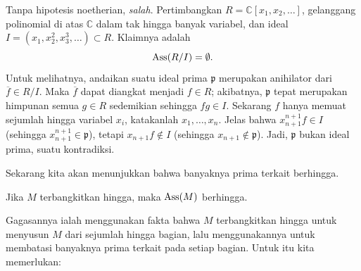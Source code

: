 \begin{example}
Tanpa hipotesis noetherian, 
\emph{salah}. Pertimbangkan $R = \mathbb{C}[x_1, x_2, \dots]$, gelanggang polinomial
di atas $\mathbb{C}$ dalam tak hingga banyak variabel, dan ideal $I = (x_1,
x_2^2, x_3^3, \dots) \subset R$.
Klaimnya adalah 
\[ \operatorname{Ass}(R/I ) = \emptyset.  \]
Untuk melihatnya, andaikan suatu ideal prima $\mathfrak{p}$ merupakan anihilator dari
$\overline{f}\in R/I$. Maka $\overline{f}$ dapat diangkat menjadi $f \in R$; akibatnya,
$\mathfrak{p}$ tepat merupakan himpunan semua $g \in R$ sedemikian sehingga $fg \in I$.
Sekarang $f$ hanya memuat sejumlah hingga variabel $x_i$, katakanlah $x_1, \dots,
x_n$. Jelas bahwa $x_{n+1}^{n+1} f \in I$ (sehingga $x_{n+1}^{n+1} \in
\mathfrak{p}$), tetapi $x_{n+1} f \notin I$ (sehingga $x_{n+1} \notin \mathfrak{p}$).
Jadi, $\mathfrak{p}$ bukan ideal prima, suatu kontradiksi.
\end{example} 

Sekarang kita akan menunjukkan bahwa banyaknya prima terkait berhingga.

\begin{proposition} \label{finiteassm}
Jika $M$ terbangkitkan hingga, maka $\operatorname{Ass}(M)$ berhingga.
\end{proposition}

Gagasannya ialah menggunakan fakta bahwa $M$ terbangkitkan hingga untuk menyusun
$M$ dari sejumlah hingga bagian, lalu menggunakannya untuk membatasi banyaknya prima
terkait pada setiap bagian. Untuk itu kita memerlukan:

